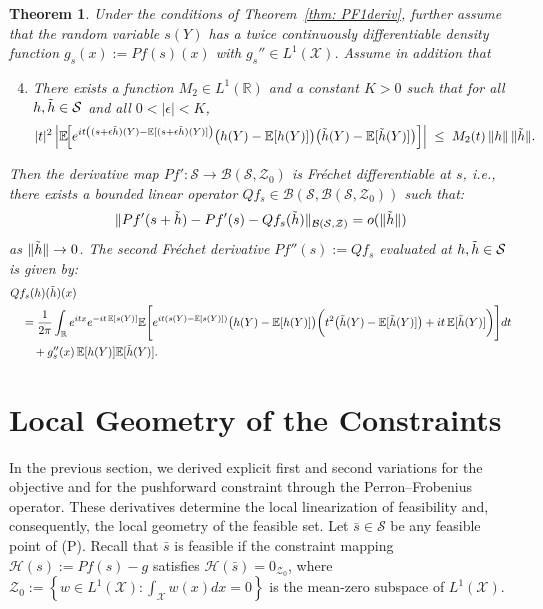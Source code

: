 \documentclass[12pt,leqno]{amsart}
\newtheorem{theorem}{Theorem}
\begin{document}
\begin{theorem}\label{thm: PF2deriv} 
Under the conditions of Theorem~\ref{thm: PF1deriv}, further assume that the random variable $s(Y)$ has a twice
continuously differentiable density function $g_s(x):=Pf(s)(x)$ with $g_s''\in L^1(\mathcal{X})$.
Assume in addition that 
\begin{enumerate}[label=(A\arabic*),itemsep=0.4em]
\setcounter{enumi}{3}
\item
There exists a function $M_2\in L^1(\mathbb R)$ and a constant $K>0$ such that for all
$h,\Tilde h\in\mathcal{S}$ and all $0<|\epsilon|<K$,
\begin{align}\label{eq:M2_dom}
|t|^2\,
\Big|\mathbb E\!\Big[
e^{it\left((s+\epsilon\Tilde h)(Y)-\mathbb E[(s+\epsilon\Tilde h)(Y)]\right)}
\big(h(Y)-\mathbb E[h(Y)]\big)\big(\Tilde h(Y)-\mathbb E[\Tilde h(Y)]\big)
\Big]\Big|
\;\le\; M_2(t)\,\|h\|\,\|\Tilde h\|.
\end{align}
\end{enumerate}
Then the derivative map $Pf':\mathcal{S}\to\mathcal{B}(\mathcal{S},\mathcal{Z}_0)$ is Fr\'echet differentiable at $s$, i.e., there exists a bounded linear operator $Qf_s \in \mathcal{B}(\mathcal{S}, \mathcal{B}(\mathcal{S},\mathcal{Z}_0))$ such that:
\[\|Pf'(s+\Tilde{h}) - Pf'(s) - Qf_s(\Tilde{h})\|_{\mathcal{B}(\mathcal{S},\mathcal{Z})} = o(\|\Tilde{h}\|)
\]
as $\|\Tilde{h}\| \to 0$. The second Fr\'echet derivative $Pf''(s) := Qf_s$ evaluated at $h,\Tilde{h}\in\mathcal{S}$ is given by:
\begin{align*}
&Qf_s(h)(\Tilde{h})(x) \\
& \quad =\frac{1}{2\pi}\int_{\mathbb R} e^{itx} e^{-it\,\mathbb E [s(Y)] }\mathbb E\Bigg[ e^{it(s(Y)-\mathbb E [s(Y)])}
\big(h(Y)-\mathbb E[h(Y)]\big)\bigg(t^2\big(\Tilde{h}(Y)-\mathbb E[\Tilde{h}(Y)]\big)+it\,\mathbb E[\Tilde{h}(Y)]\bigg)\Bigg]dt\\
&\qquad+g_s''(x)\,\mathbb E [h(Y)] \mathbb E [\Tilde{h}(Y)].
\end{align*}
\end{theorem}

\section{Local Geometry of the Constraints}\label{sec:local-geometry}
In the previous section, we derived explicit first and second variations for the objective and for the pushforward constraint through the Perron–Frobenius operator. These derivatives determine the local linearization of feasibility and, consequently, the local geometry of the feasible set. Let $\bar{s} \in \mathcal{S}$ be any feasible point of (P). Recall that $\bar{s}$ is feasible if the constraint mapping $\mathcal{H}(s) := Pf(s) - g$ satisfies $\mathcal{H}(\bar{s}) = 0_{\mathcal{Z}_0}$, where $\mathcal{Z}_0 := \left\{w\in L^1(\mathcal{X}) : \int_{\mathcal{X}} w(x)dx = 0 \right\}$ is the mean-zero subspace of $L^1(\mathcal{X})$.
\end{document}
